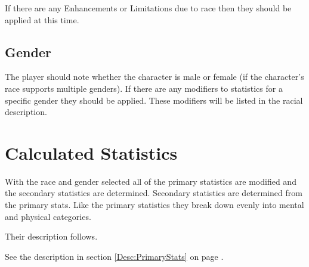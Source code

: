 If there are any Enhancements or Limitations due to race
then they should be applied at this time.

\subsection{Gender}

The player should note whether the character is male or
female (if the character's race supports multiple genders). If there are
any modifiers to statistics for a specific gender they should be applied.
These modifiers will be listed in the racial description.

\section{Calculated Statistics}

With the race and gender selected all of the primary statistics are modified 
and the secondary statistics are determined. Secondary statistics are 
determined from the primary stats. Like the primary statistics they break 
down evenly into mental and physical categories.

Their description follows.

See the description in section \ref{Desc:PrimaryStats} on page
\pageref{Desc:PrimaryStats}.

